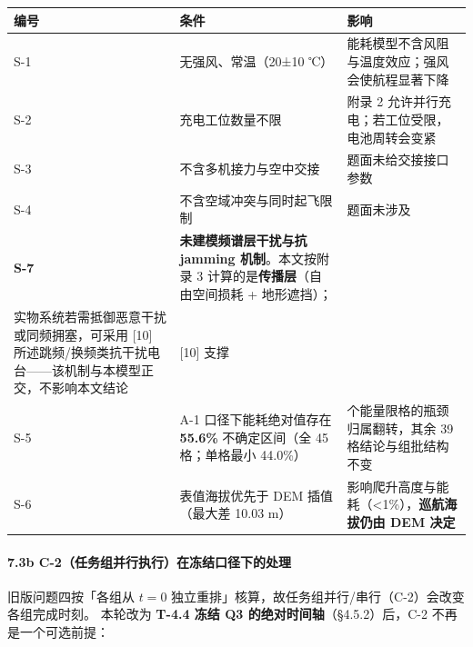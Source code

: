 \documentclass[
  10.5pt,
]{article}
\newcounter{none} %
\begin{document}
{\def\LTcaptype{none} %
\begin{longtable}[]{@{}
  >{\raggedright\arraybackslash}p{}
  >{\raggedright\arraybackslash}p{}
  >{\raggedright\arraybackslash}p{}@{}}
\toprule\noalign{}
\begin{minipage}[b]{\linewidth}\raggedright
编号
\end{minipage} & \begin{minipage}[b]{\linewidth}\raggedright
条件
\end{minipage} & \begin{minipage}[b]{\linewidth}\raggedright
影响
\end{minipage} \\
\midrule\noalign{}
\endhead
\bottomrule\noalign{}
\endlastfoot
S-1 & 无强风、常温（20±10 ℃） &
能耗模型不含风阻与温度效应；强风会使航程显著下降 \\
S-2 & 充电工位数量不限 & 附录 2
允许并行充电；若工位受限，电池周转会变紧 \\
S-3 & 不含多机接力与空中交接 & 题面未给交接接口参数 \\
S-4 & 不含空域冲突与同时起飞限制 & 题面未涉及 \\
\textbf{S-7} & \textbf{未建模频谱层干扰与抗 jamming 机制}。本文按附录 3
计算的是\textbf{传播层}（自由空间损耗 + 地形遮挡）； & \\
实物系统若需抵御恶意干扰或同频拥塞，可采用 {[}10{]}
所述跳频/换频类抗干扰电台------该机制与本模型正交，不影响本文结论 &
{[}10{]} 支撑 & \\
S-5 & A-1 口径下能耗绝对值存在 \textbf{55.6\%} 不确定区间（全 45
格；单格最小 44.0\%） & 6 个能量限格的瓶颈归属翻转，其余 39
格结论与组批结构不变 \\
S-6 & 表值海拔优先于 DEM 插值（最大差 10.03 m） &
影响爬升高度与能耗（\textless1\%），\textbf{巡航海拔仍由 DEM 决定} \\
\end{longtable}
}

\paragraph{7.3b
C-2（任务组并行执行）在冻结口径下的处理}\label{b-c-2ux4efbux52a1ux7ec4ux5e76ux884cux6267ux884cux5728ux51bbux7ed3ux53e3ux5f84ux4e0bux7684ux5904ux7406}

旧版问题四按「各组从 \(t=0\)
独立重排」核算，故任务组并行/串行（C-2）会改变各组完成时刻。 本轮改为
\textbf{T-4.4 冻结 Q3 的绝对时间轴}（§4.5.2）后，C-2
不再是一个可选前提：
\end{document}
